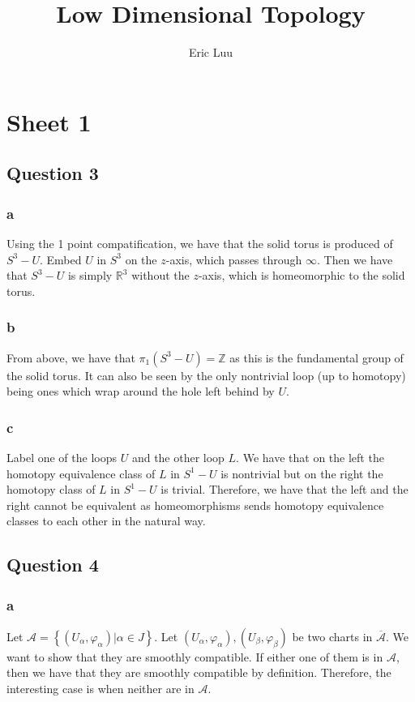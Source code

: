 \documentclass{article}
\title{Low Dimensional Topology}
\author{Eric Luu}
\theoremstyle{definition}
\numberwithin{theorem}{section}
\numberwithin{equation}{section}
\newcommand{\atlas}{\mathcal{A}}
\begin{document}
\section{Sheet 1}


\subsection{Question 3}

\subsubsection{a}
Using the 1 point compatification, we have that the solid torus is produced of $S^3 - U$. Embed $U$ in $S^3$ on the $z$-axis, which passes through $\infty$. Then we have that $S^3 - U$ is simply $\mathbb{R}^3$ without the $z$-axis, which is homeomorphic to the solid torus. 
\subsubsection{b}
From above, we have that $\pi_1(S^3 - U) = \mathbb{Z}$ as this is the fundamental group of the solid torus. It can also be seen by the only nontrivial loop (up to homotopy) being ones which wrap around the hole left behind by $U$. 
\subsubsection{c}
Label one of the loops $U$ and the other loop $L$. We have that on the left the homotopy equivalence class of $L$ in $S^1 - U$ is nontrivial but on the right the homotopy class of $L$ in $S^1 - U$ is trivial. Therefore, we have that the left and the right cannot be equivalent as homeomorphisms sends homotopy equivalence classes to each other in the natural way. 
\subsection{Question 4}
\subsubsection{a}
Let $\atlas = \left\{(U_\alpha, \varphi_\alpha) | \alpha \in J\right\}$. Let $(U_\alpha, \varphi_\alpha), (U_\beta, \varphi_\beta)$ be two charts in $\overline{\atlas}$. We want to show that they are smoothly compatible. If either one of them is in $\atlas$, then we have that they are smoothly compatible by definition. Therefore, the interesting case is when neither are in $\atlas$. 
\end{document}
